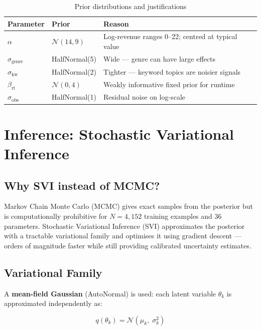 \documentclass[12pt,a4paper]{article}
\begin{document}
\begin{table}[H]
\centering
\begin{tabular}{lll}
\toprule
\textbf{Parameter} & \textbf{Prior} & \textbf{Reason} \\
\midrule
$\alpha$ & $\mathcal{N}(14, 9)$ & Log-revenue ranges 0--22; centred at typical value \\
$\sigma_\text{genre}$ & HalfNormal(5) & Wide — genre can have large effects \\
$\sigma_\text{kw}$ & HalfNormal(2) & Tighter — keyword topics are noisier signals \\
$\beta_\text{rt}$ & $\mathcal{N}(0, 4)$ & Weakly informative fixed prior for runtime \\
$\sigma_\text{obs}$ & HalfNormal(1) & Residual noise on log-scale \\
\bottomrule
\end{tabular}
\caption{Prior distributions and justifications}
\end{table}

\section{Inference: Stochastic Variational Inference}

\subsection{Why SVI instead of MCMC?}

Markov Chain Monte Carlo (MCMC) gives exact samples from the posterior
but is computationally prohibitive for $N = 4{,}152$ training examples
and 36 parameters. Stochastic Variational Inference (SVI) approximates
the posterior with a tractable variational family and optimises it using
gradient descent — orders of magnitude faster while still providing
calibrated uncertainty estimates.

\subsection{Variational Family}

A \textbf{mean-field Gaussian} (AutoNormal) is used: each latent variable
$\theta_k$ is approximated independently as:

\begin{equation}
  q(\theta_k) = \mathcal{N}(\mu_k,\; \sigma_k^2)
\end{equation}
\end{document}
